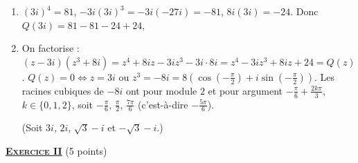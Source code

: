 \begin{enumerate}
      \begin{enumerate}
         \item {}
            $(3i)^4 = 81$, $-3i(3i)^3 = -3i(-27i) = -81$, $8i(3i) = -24$. Donc $Q(3i) = 81 - 81 - 24 + 24$, 
         \item {}
            On factorise : $(z - 3i)(z^3 + 8i) = z^4 + 8iz - 3iz^3 - 3i\cdot 8i = z^4 - 3iz^3 + 8iz + 24 = Q(z)$.
            $Q(z) = 0 \iff z = 3i$ ou $z^3 = -8i = 8\left(\cos\left(-\frac{\pi}{2}\right) + i\sin\left(-\frac{\pi}{2}\right)\right)$.
            Les racines cubiques de $-8i$ ont pour module $2$ et pour argument $-\frac{\pi}{6} + \frac{2k\pi}{3}$, $k \in \{0, 1, 2\}$,
            soit $-\frac{\pi}{6}$, $\frac{\pi}{2}$, $\frac{7\pi}{6}$ (c'est-\`a-dire $-\frac{5\pi}{6}$).
            \par\noindent{}
            (Soit $3i$, $2i$, $\sqrt{3} - i$ et $-\sqrt{3} - i$.)
      \end{enumerate}
\end{enumerate}
\noindent \underline{\textsc{\textbf{Exercice II}}} (5 points)
